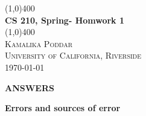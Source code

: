 \documentclass[12pt, oneside]{article}   	%
\begin{document}
	
\begin{titlepage}
	\begin{center}
	\line(1,0){400} \\
    [0.25in]
    \Huge{\bfseries CS 210, Spring- Homwork 1} \\
    [2mm]
    \line(1,0){400} \\
    [3 cm]
    
    \textsc{\LARGE Kamalika Poddar} \\
   
  
    \textsc{\LARGE University of California, Riverside} \\
    [0.7cm]
  \vspace*{7 cm}
  \today
    \end{center} 

\end{titlepage}

\newpage
\vspace{2cm}

\begin{center}
\textbf{ \Large ANSWERS}\\
\end{center}

\vspace{0.5cm}
\textbf{ \Large Errors and sources of error}\\
\end{document}
